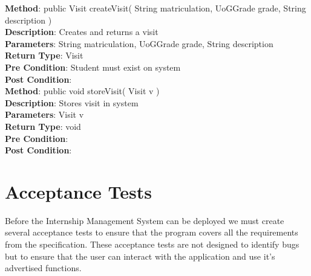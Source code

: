 \documentclass{l3deliverable}
\begin{document}
\textbf{Method}: public Visit createVisit( String matriculation, UoGGrade grade, String description )\\
\textbf{Description}: Creates and returns a visit\\
\textbf{Parameters}: String matriculation, UoGGrade grade, String description\\
\textbf{Return Type}: Visit\\
\textbf{Pre Condition}: Student must exist on system\\
\textbf{Post Condition}:\\

\textbf{Method}: public void storeVisit( Visit v )\\
\textbf{Description}: Stores visit in system\\
\textbf{Parameters}: Visit v\\
\textbf{Return Type}: void\\
\textbf{Pre Condition}:\\
\textbf{Post Condition}:\\






\section{Acceptance Tests}

Before the Internship Management System can be deployed we must create several acceptance tests to ensure that the program covers all the requirements from the specification. These acceptance tests are not designed to identify bugs but to ensure that the user can interact with the application and use it's advertised functions.\\
\end{document}
